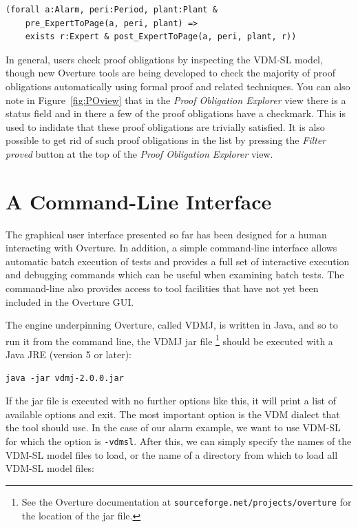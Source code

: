{\begin{lstlisting}
(forall a:Alarm, peri:Period, plant:Plant &
    pre_ExpertToPage(a, peri, plant) => 
    exists r:Expert & post_ExpertToPage(a, peri, plant, r))
\end{lstlisting}

In general, users check proof obligations by inspecting the VDM-SL model,
though new Overture tools are being developed to check the majority of
proof obligations automatically using formal proof and related
techniques. You can also note in Figure~\ref{fig:POview} that in the
\emph{Proof Obligation Explorer} view there is a status field and in there
a few of the proof obligations have a checkmark. This is used to
indidate that these proof obligations are trivially satisfied. It is
also possible to get rid of such proof obligations in the list by
pressing the \emph{Filter proved} button at the top of the \emph{Proof
  Obligation Explorer} view.

\section{A Command-Line Interface}\label{sec:cmdline}

The graphical user interface presented so far has been designed for a
human interacting with Overture. In addition, a simple command-line
interface allows automatic batch execution of tests and provides a
full set of interactive execution and debugging commands which can be
useful when examining batch tests. The command-line also provides
access to tool facilities that have not yet been included in the
Overture GUI.

The engine underpinning Overture, called VDMJ, is written in Java, and
so to run it from the command line, the VDMJ jar file \footnote{See
  the Overture documentation at
  \texttt{sourceforge.net/projects/overture} for the location of the
  jar file.}  should be executed with a Java JRE (version 5 or later):

\lstset{style=tool,language=}
\begin{lstlisting}
java -jar vdmj-2.0.0.jar
\end{lstlisting}

\noindent If the jar file is executed with no further options like
this, it will print a list of available options and exit. The most
important option is the VDM dialect that the tool should use. In the
case of our alarm example, we want to use VDM-SL for which the option
is \verb|-vdmsl|. After this, we can simply specify the names of the
VDM-SL model files to load, or the name of a directory from which to
load all VDM-SL model files:

}
